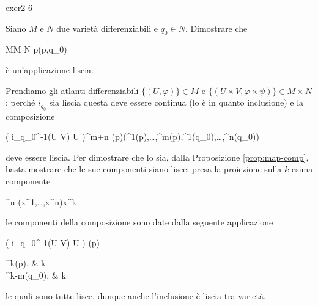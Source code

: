 {exer2-6}
{
Siano $ M $ e $ N $ due varietà differenziabili e $ q_{0} \in N $. Dimostrare che

	{M}{M \times N}
	{p}{(p,q_{0})}

è un'applicazione liscia.
}
{
Prendiamo gli atlanti differenziabili $ \{(U,\varphi)\} \in M $ e $ \{(U \times V,\varphi \times \psi)\} \in M \times N $: perché $ i_{q_{0}} $ sia liscia questa deve essere continua (lo è in quanto inclusione) e la composizione

	{\varphi( i_{q_{0}}^{-1}(U \times V) \cap U )}{\R^{m+n}}
	{\varphi(p)}{(\varphi^{1}(p),\dots,\varphi^{m}(p),\psi^{1}(q_{0}),\dots,\psi^{n}(q_{0}))}

deve essere liscia. Per dimostrare che lo sia, dalla Proposizione \ref{prop:map-comp}, basta mostrare che le sue componenti siano lisce: presa la proiezione sulla $ k $-esima componente

	{\R^{n}}{\R}
	{(x^{1},\dots,x^{n})}{x^{k}}

le componenti della composizione sono date dalla seguente applicazione

	{\varphi( i_{q_{0}}^{-1}(U \times V) \cap U )}{\R}
	{\varphi(p)}{%
					\begin{cases}
						\varphi^{k}(p), & k \in [1,m] \\
						\psi^{k-m}(q_{0}), & k \in [m+1,m+n]
					\end{cases}%
					}

le quali sono tutte lisce, dunque anche l'inclusione è liscia tra varietà.
}


